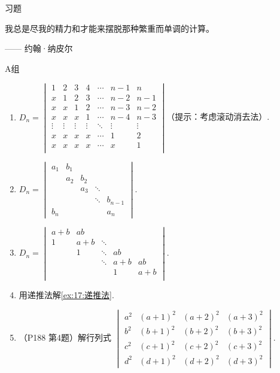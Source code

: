 \centerline{\heiti \Large 习题}
\vspace{2ex}
{\kaishu 我总是尽我的精力和才能来摆脱那种繁重而单调的计算。}
\begin{flushright}
    \kaishu
    —— 约翰·纳皮尔
\end{flushright}
\centerline{\heiti A组}
\begin{enumerate}
    \item $ D_n=\begin{vmatrix}
        1&2&3&4&\cdots&n-1&n\\
        x&1&2&3&\cdots&n-2&n-1\\
        x&x&1&2&\cdots&n-3&n-2\\
        x&x&x&1&\cdots&n-4&n-3\\
        \vdots&\vdots&\vdots&\vdots&\ddots&\vdots&\vdots\\
        x&x&x&x&\cdots&1&2\\
        x&x&x&x&\cdots&x&1\\
    \end{vmatrix}$（提示：考虑滚动消去法）.

    \item $ D_n=\begin{vmatrix}
        a_1&b_1&&&\\
        &a_2&b_2&&\\
        &&a_3&\ddots&\\
        &&&\ddots&b_{n-1}\\
        b_n&&&&a_n
    \end{vmatrix}$.

    \item $D_n=\begin{vmatrix}
        a+b&ab&&&\\
        1&a+b&\ddots&&\\
        &1&\ddots&ab&\\
        &&\ddots&a+b&ab\\
        &&&1&a+b\\
    \end{vmatrix}$.

    \item 用递推法解\autoref{ex:17:递推法}.

    \item （P188 第4题）解行列式 $ \begin{vmatrix}
        a^{2} & (a+1)^{2} & (a+2)^{2} & (a+3)^{2} \\
        b^{2} & (b+1)^{2} & (b+2)^{2} & (b+3)^{2} \\
        c^{2} & (c+1)^{2} & (c+2)^{2} & (c+3)^{2} \\
        d^{2} & (d+1)^{2} & (d+2)^{2} & (d+3)^{2}
    \end{vmatrix} $.


\end{enumerate}
